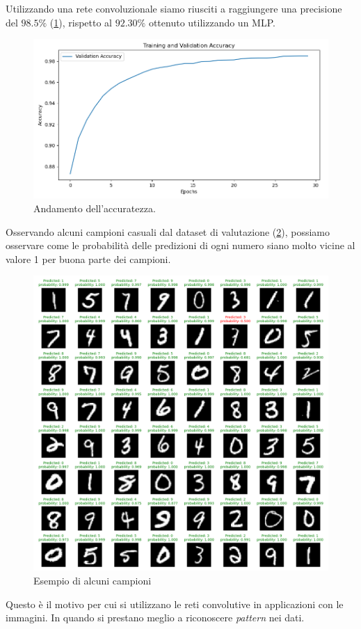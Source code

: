 Utilizzando una rete convoluzionale siamo riusciti a raggiungere una precisione del $98.5\%$ 
(\ref{fig:LaNet5_accuracy}), rispetto al $92.30\%$ ottenuto utilizzando un MLP.

\begin{figure}[H]
    \centering
    \includegraphics[width=1\textwidth]{Immagini/sperimentazione/LaNet5_accuracy.png}
    \caption{Andamento dell'accuratezza.}
    \label{fig:LaNet5_accuracy}
\end{figure}

Osservando alcuni campioni casuali dal dataset di valutazione 
(\ref{fig:MNIST_processato_LaNet5}), possiamo osservare come le 
probabilità delle predizioni di ogni numero siano molto vicine al valore 1 per 
buona parte dei campioni.

\begin{figure}[H]
    \includegraphics[width=1.0\textwidth]{Immagini/sperimentazione/MNSIT_LaNet5.png}
    \caption{Esempio di alcuni campioni}
    \label{fig:MNIST_processato_LaNet5}
\end{figure}

Questo è il motivo per cui si utilizzano le reti convolutive in applicazioni 
con le immagini. In quando si prestano meglio a riconoscere \textit{pattern} nei dati.
\newpage
